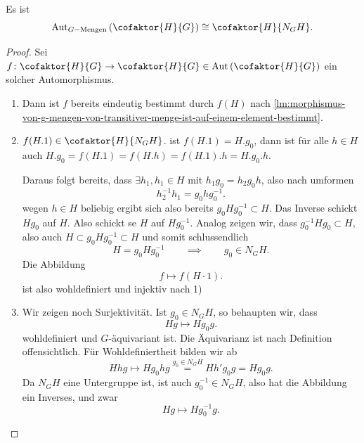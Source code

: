 \begin{proposition}
    Es ist
    \[
        \Aut_{G-\text{Mengen}}\left(\cofaktor{H}{G}\right) \cong \cofaktor{H}{N_GH}
    .\] 
\end{proposition}
\begin{proof}
    Sei $f\colon  \cofaktor{H}{G} \to  \cofaktor{H}{G}\in \Aut \left(\cofaktor{H}{G}\right)$ ein solcher Automorphismus.
    \begin{enumerate}[1)]
    \item Dann ist $f$ bereits eindeutig bestimmt durch  $f(H)$ nach \autoref{lm:morphismus-von-g-mengen-von-transitiver-menge-ist-auf-einem-element-bestimmt}.
    \item $f(H.1) \in \cofaktor{H}{N_GH}$. ist $f(H.1) = H.g_0$, dann ist für alle $h\in H$ auch $H.g_0 = f(H.1) = f(H.h) = f(H.1).h = H.g_0.h$.

        Daraus folgt bereits, dass $\exists h_1,h_1 \in H$ mit $h_1g_0 = h_2g_0h$, also nach umformen
        \[
       h_2^{-1}h_1 = g_0hg_0^{-1}
        .\] 
        wegen $h\in H$ beliebig ergibt sich also bereits $g_0Hg_0^{-1}\subset H$. Das Inverse schickt $Hg_0$ auf $H$. Also schickt se  $H$ auf  $Hg_0^{-1}$. Analog zeigen wir, dass $g_0^{-1}Hg_0 \subset H$, also auch $H\subset g_0Hg_0^{-1}\subset H$ und somit schlussendlich
        \[
        H = g_0Hg_0^{-1} \qquad \implies \qquad g_0\in N_GH
        .\] 
        Die Abbildung
        \[
            f \mapsto f(H\cdot 1)
        .\] 
        ist also wohldefiniert und injektiv nach 1)

    \item Wir zeigen noch Surjektivität. Ist $g_0\in N_GH$, so behaupten wir, dass
        \[
        Hg \mapsto Hg_0g
        .\] 
        wohldefiniert und $G$-äquivariant ist. Die Äquivarianz ist nach Definition offensichtlich. Für Wohldefiniertheit bilden wir ab
         \[
             Hhg \mapsto H g_0hg \stackrel{g_0\in N_GH}{=} H h'g_0g = Hg_0g
        .\] 
        Da $N_GH$ eine Untergruppe ist, ist auch  $g_0^{-1}\in N_GH$, also hat die Abbildung ein Inverses, und zwar
        \[
        Hg \mapsto Hg_0^{-1}g
        .\] 
\end{enumerate}
\end{proof}

